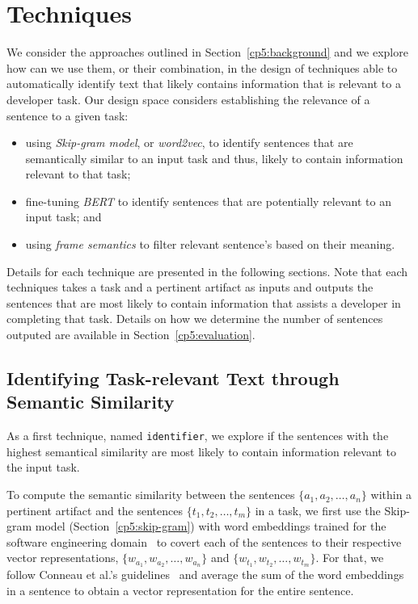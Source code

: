 \section{Techniques}
\label{cp5:approaches}




We consider the approaches outlined in Section~\ref{cp5:background} and we explore 
how can we use them, or their combination, in the design of techniques able to automatically identify text that likely contains information that is relevant to a developer task. 
Our design space considers establishing the relevance of a sentence to a given task:

\begin{itemize}
    \item using \textit{Skip-gram model}, or \textit{word2vec}, to identify sentences that are semantically similar to an input task and thus, likely to contain information relevant to that task;
    
    \item fine-tuning \textit{BERT} to identify sentences that are potentially relevant to an input task; and

    \item using \textit{frame semantics} to filter relevant sentence's based on their meaning.
\end{itemize}


Details for each technique are presented in the following sections.
Note that each techniques takes a task and a pertinent artifact as inputs and outputs the sentences 
that are most likely to contain information that assists a developer in completing that task. 
Details on how we determine the number of sentences outputed are available in Section~\ref{cp5:evaluation}.



\subsection{Identifying Task-relevant Text through Semantic Similarity}
\label{cp5:approach-w2v}


As a first technique, named \texttt{identifier}, we explore if the sentences with the highest semantical similarity are most likely to contain information relevant to the input task. 


To compute the semantic similarity between the sentences $\{a_1, a_2, \dots, a_n\}$ within a pertinent artifact and the sentences $\{t_1, t_2, \dots, t_m\}$ in a task,
we first
 use the Skip-gram model (Section~\ref{cp5:skip-gram}) with word embeddings trained for the software engineering domain~\cite{Efstathiou2018} to covert each of the sentences to their respective vector representations, $\{ w_{a_1}, w_{a_2}, \dots, w_{a_n}\}$ and $\{ w_{t_1}, w_{t_2}, \dots, w_{t_m}\}$. For that, we follow Conneau et al.'s guidelines~\cite{conneau2018} 
 and average the sum of the word embeddings in a sentence to obtain a vector representation for the entire sentence.


